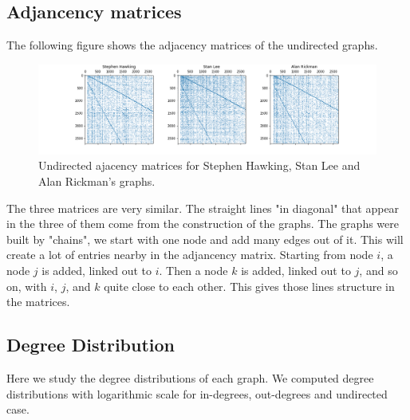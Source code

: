 \documentclass[conference]{IEEEtran}
\begin{document}
\subsection{Adjancency matrices}
 The following figure shows the adjacency matrices of the undirected graphs.
 
\begin{figure}[!htb]
  \includegraphics[width=\linewidth]{matrices.png}
\caption{Undirected ajacency matrices for Stephen Hawking, Stan Lee and Alan Rickman's graphs. }
\end{figure}

The three matrices are very similar. The straight lines "in diagonal" that appear in the three of them come from the construction of the graphs. The graphs were built by "chains", we start with one node and add many edges out of it. This will create a lot of entries nearby in the adjancency matrix. Starting from node $i$, a node $j$ is added, linked out to $i$. Then a node $k$ is added, linked out to $j$, and so on, with $i$, $j$, and $k$ quite close to each other. This gives those lines structure in the matrices. 

\subsection{Degree Distribution}

Here we study the degree distributions of each graph. We computed degree distributions with logarithmic scale for in-degrees, out-degrees and undirected case. 
\end{document}
